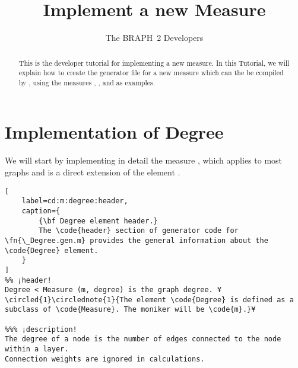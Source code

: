\documentclass{tufte-handout}
\title{Implement a new Measure}
\author[The BRAPH~2 Developers]{The BRAPH~2 Developers}
\begin{document}
\maketitle

\begin{abstract}
\noindent
This is the developer tutorial for implementing a new measure. 
In this Tutorial, we will explain how to create the generator file  for a new measure which can the be compiled by , using the measures , , and  as examples.
\end{abstract}

\tableofcontents

\clearpage
\section{Implementation of Degree}

We will start by implementing in detail the measure , which applies to most graphs and is a direct extension of the element .

\begin{lstlisting}[
	label=cd:m:degree:header,
	caption={
		{\bf Degree element header.}
		The \code{header} section of generator code for \fn{\_Degree.gen.m} provides the general information about the \code{Degree} element.
	}
]
%% ¡header!
Degree < Measure (m, degree) is the graph degree. ¥\circled{1}\circlednote{1}{The element \code{Degree} is defined as a subclass of \code{Measure}. The moniker will be \code{m}.}¥

%%% ¡description!
The degree of a node is the number of edges connected to the node within a layer. 
Connection weights are ignored in calculations.
\end{lstlisting}
\end{document}

